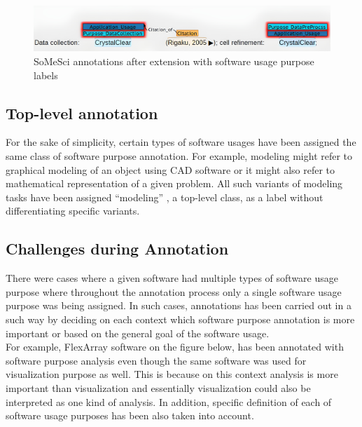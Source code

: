 \begin{figure}[htbp]
	\centering
	\includegraphics[width=.85\textwidth]{4.graphics/figures/ch_4/after_ann_hd}
	\caption{\ac{SoMeSci} annotations after extension with software usage purpose labels}
	\label{fig:chapter04:setup}
\end{figure}


\subsection{Top-level annotation}
\label{subsec:dataset:tool:Assumptions}

For the sake of simplicity, certain types of software usages have been assigned the same class of software purpose annotation. For example, modeling might refer to graphical modeling of an object using \ac{CAD} software or it might also refer to mathematical representation of a given problem.  All such variants of modeling tasks have been assigned “modeling” , a top-level class, as a label without differentiating specific variants. 


\subsection{Challenges during Annotation }
\label{subsec:dataset:tool:Challenges}

There were cases where a given software had multiple types of software usage purpose where throughout the annotation process only a single software usage purpose was being assigned. In such cases,  annotations has been carried out in a such way by deciding on each context which software purpose annotation is more important or based on the general goal of the software usage. \\

For example, FlexArray software on the figure below, has been annotated with software purpose analysis even though the same software was used for visualization purpose as well. This is because on this context analysis is more important than visualization and essentially visualization could also be interpreted as one kind of analysis. In addition, specific definition of each of software usage purposes has been also taken into account. \\

